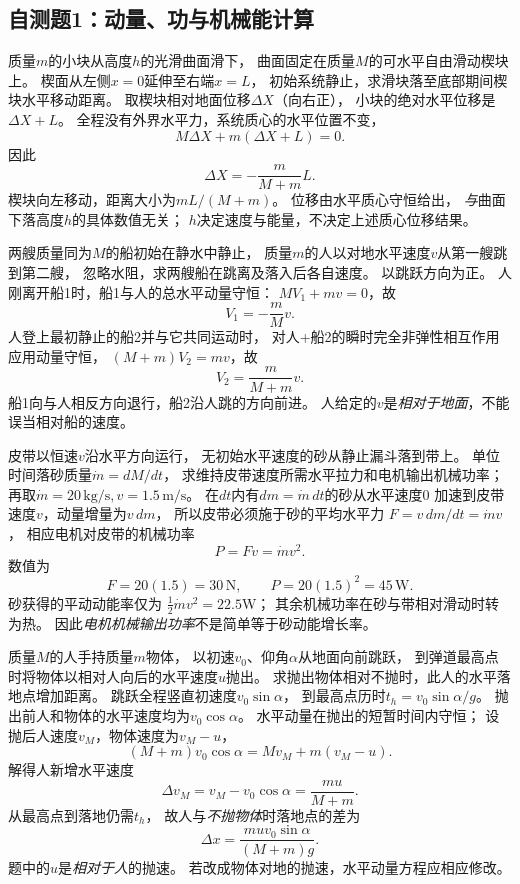 \subsection{自测题1：动量、功与机械能计算}

\problemtext 质量$m$的小块从高度$h$的光滑曲面滑下，
曲面固定在质量$M$的可水平自由滑动楔块上。
楔面从左侧$x=0$延伸至右端$x=L$，
初始系统静止，求滑块落至底部期间楔块水平移动距离。
\workings
取楔块相对地面位移$\Delta X$（向右正），
小块的绝对水平位移是$\Delta X+L$。
全程没有外界水平力，系统质心的水平位置不变，
\[
M\Delta X+m(\Delta X+L)=0.
\]
因此
\[
\boxed{\Delta X=-\frac{m}{M+m}L}.
\]
楔块向左移动，距离大小为$mL/(M+m)$。
\crosscheck 位移由水平质心守恒给出，
\emph{与}曲面下落高度$h$的具体数值无关；
$h$决定速度与能量，不决定上述质心位移结果。

\problemtext 两艘质量同为$M$的船初始在静水中静止，
质量$m$的人以对地水平速度$v$从第一艘跳到第二艘，
忽略水阻，求两艘船在跳离及落入后各自速度。
\workings
以跳跃方向为正。
人刚离开船1时，船1与人的总水平动量守恒：
$MV_1+mv=0$，故
\[
\boxed{V_1=-\frac mM v}.
\]
人登上最初静止的船2并与它共同运动时，
对人+船2的瞬时完全非弹性相互作用应用动量守恒，
$(M+m)V_2=mv$，故
\[
\boxed{V_2=\frac{m}{M+m}v}.
\]
\crosscheck 船1向与人相反方向退行，船2沿人跳的方向前进。
人给定的$v$是\emph{相对于地面}，不能误当相对船的速度。

\problemtext 皮带以恒速$v$沿水平方向运行，
无初始水平速度的砂从静止漏斗落到带上。
单位时间落砂质量$\dot m=dM/dt$，
求维持皮带速度所需水平拉力和电机输出机械功率；
再取$\dot m=20\,\mathrm{kg/s},v=1.5\,\mathrm{m/s}$。
\workings
在$dt$内有$dm=\dot m\,dt$的砂从水平速度0
加速到皮带速度$v$，动量增量为$v\,dm$，
所以皮带必须施于砂的平均水平力
$F=v\,dm/dt=\dot m v$，
相应电机对皮带的机械功率
\[
\boxed{P=Fv=\dot m v^2}.
\]
数值为
\[
\boxed{F=20(1.5)=30\,\mathrm N},\qquad
\boxed{P=20(1.5)^2=45\,\mathrm W}.
\]
\crosscheck 砂获得的平动动能率仅为
$\tfrac12\dot m v^2=22.5$W；
其余机械功率在砂与带相对滑动时转为热。
因此\emph{电机机械输出功率}不是简单等于砂动能增长率。

\problemtext 质量$M$的人手持质量$m$物体，
以初速$v_0$、仰角$\alpha$从地面向前跳跃，
到弹道最高点时将物体以相对人向后的水平速度$u$抛出。
求抛出物体相对不抛时，此人的水平落地点增加距离。
\workings
跳跃全程竖直初速度$v_0\sin\alpha$，
到最高点历时$t_h=v_0\sin\alpha/g$。
抛出前人和物体的水平速度均为$v_0\cos\alpha$。
水平动量在抛出的短暂时间内守恒；
设抛后人速度$v_M$，物体速度为$v_M-u$，
\[
(M+m)v_0\cos\alpha=Mv_M+m(v_M-u).
\]
解得人新增水平速度
\[
\Delta v_M=v_M-v_0\cos\alpha=\frac{mu}{M+m}.
\]
从最高点到落地仍需$t_h$，
故人与\emph{不抛物体}时落地点的差为
\[
\boxed{\Delta x=\frac{muv_0\sin\alpha}{(M+m)g}}.
\]
\crosscheck 题中的$u$是\emph{相对于人}的抛速。
若改成物体对地的抛速，水平动量方程应相应修改。

